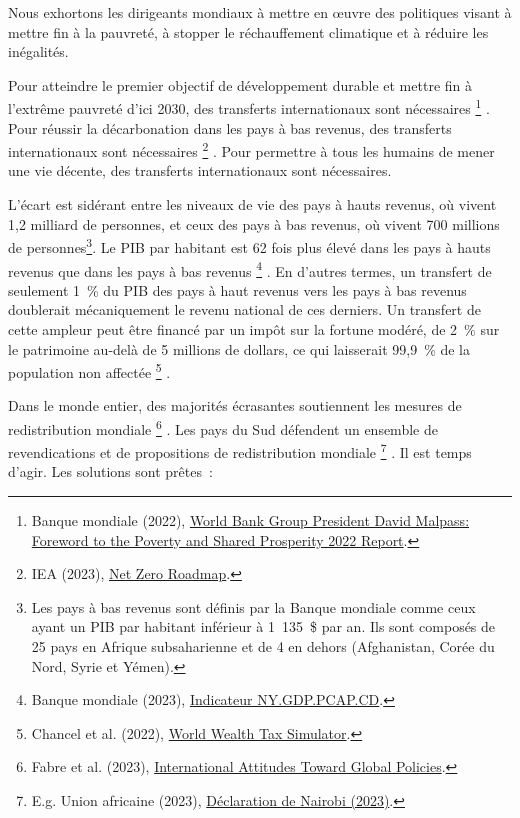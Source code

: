 \documentclass[a5paper,french,openany]{memoir}
\begin{document}
Nous exhortons les dirigeants mondiaux à mettre en œuvre des politiques visant à mettre fin à la pauvreté, à stopper le réchauffement climatique et à réduire les inégalités. 

Pour atteindre le premier objectif de développement durable et mettre fin à l'extrême pauvreté d'ici 2030, des transferts internationaux sont nécessaires
\footnote{Banque mondiale (2022), \href{https://www.worldbank.org/en/news/statement/2022/10/05/world-bank-group-president-david-malpass-foreword-to-the-poverty-and-shared-prosperity-report}{World Bank Group President David Malpass: Foreword to the Poverty and Shared Prosperity 2022 Report}.}%
. Pour réussir la décarbonation dans les pays à bas revenus, des transferts internationaux sont nécessaires
\footnote{IEA (2023), \href{https://www.iea.org/reports/net-zero-roadmap-a-global-pathway-to-keep-the-15-0c-goal-in-reach/}{Net Zero Roadmap}.}%
. Pour permettre à tous les humains de mener une vie décente, des transferts internationaux sont nécessaires. 

L'écart est sidérant entre les niveaux de vie des pays à hauts revenus, où vivent 1,2 milliard de personnes, et ceux des pays à bas revenus, où vivent 700 millions de personnes\footnote{Les pays à bas revenus sont définis par la Banque mondiale comme ceux ayant un PIB par habitant %
inférieur à 1~135~\$ par an. Ils sont composés de 25 pays en Afrique subsaharienne et de 4 en dehors (Afghanistan, Corée du Nord, Syrie et Yémen).}. 
Le PIB par habitant est 62 fois plus élevé dans les pays à hauts revenus que dans les pays à bas revenus
\footnote{Banque mondiale (2023), \href{https://data.worldbank.org/indicator/NY.GDP.PCAP.CD?end=2021\&locations=EU-ZG-XD-XM-1W-IN-US-CD-BI-LU-CN\&start=2021\&view=bar}{Indicateur NY.GDP.PCAP.CD}.}%
. En d'autres termes, un transfert de seulement 1~\% du PIB des pays à haut revenus vers les pays à bas revenus doublerait mécaniquement le revenu national de ces derniers. Un transfert de cette ampleur peut être financé par un impôt sur la fortune modéré, de 2~\% sur le patrimoine au-delà de 5 millions de dollars, ce qui laisserait 99,9~\% de la population non affectée
\footnote{Chancel et al. (2022), \href{https://wid.world/world-wealth-tax-simulator/}{World Wealth Tax Simulator}.}%
.

Dans le monde entier, des majorités écrasantes soutiennent les mesures de redistribution mondiale
\footnote{Fabre et al. (2023), \href{https://papers.ssrn.com/sol3/papers.cfm?abstract\_id=4448523}{International Attitudes Toward Global Policies}.}%
. Les pays du Sud défendent un ensemble de revendications et de propositions de redistribution mondiale
\footnote{E.g. Union africaine (2023), \href{https://media.africaclimatesummit.org/NAIROBI+Declaration+FURTHER+edited+060923+EN+920AM.pdf}{Déclaration de Nairobi (2023)}.}%
. Il est temps d'agir. Les solutions sont prêtes~:
\end{document}
